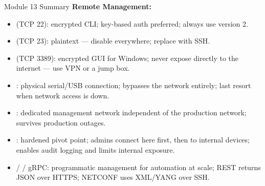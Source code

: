 \documentclass[aspectratio=169]{beamer}  %
\begin{document}
\begin{frame}[t,allowframebreaks]{Module 13 Summary}
    \textbf{Remote Management:}
    \begin{itemize}
        \item {} (TCP 22): encrypted CLI; key-based auth preferred; always use version 2.
        \item {} (TCP 23): plaintext --- disable everywhere; replace with SSH.
        \item {} (TCP 3389): encrypted GUI for Windows; never expose directly to the internet --- use VPN or a jump box.
        \item {}: physical serial/USB connection; bypasses the network entirely; last resort when network access is down.
        \item {}: dedicated management network independent of the production network; survives production outages.
        \item {}: hardened pivot point; admins connect here first, then to internal devices; enables audit logging and limits internal exposure.
        \item {} /  / gRPC: programmatic management for automation at scale; REST returns JSON over HTTPS; NETCONF uses XML/YANG over SSH.
    \end{itemize}
\end{frame}
\end{document}

